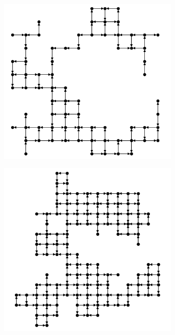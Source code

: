 \begin{figure}[t]
  \centering
  \begin{subfigure}{1.0\textwidth}
    \centering
    \includegraphics[width=0.5\linewidth]{figures/sq-grid-grow-74.png}
    \caption{}
    \label{fig:sq-grid-grow-74}
  \end{subfigure}
  \begin{subfigure}{.49\textwidth}
    \centering
    \includegraphics[width=1.0\linewidth]{figures/sq-grid-grow-124.png}
    \caption{}
    \label{fig:sq-grid-grow-124}
  \end{subfigure}
  \begin{subfigure}{.49\textwidth}
    \centering

\end{subfigure}
\end{figure}
